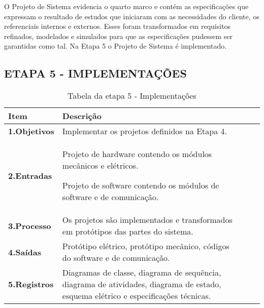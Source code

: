 O Projeto de Sistema evidencia o quarto marco e contém as especificações que expressam o resultado de estudos que iniciaram com as necessidades do cliente, os referenciais internos e externos. Esses foram transformados em requisitos refinados, modelados e simulados para que as especificações pudessem ser garantidas como tal. Na Etapa 5 o Projeto de Sistema é implementado.


\clearpage
\subsection{ETAPA 5 - IMPLEMENTAÇÕES}

\begin{table}[htbp]
	\centering
	\caption{Tabela da etapa 5 - Implementações}
	\begin{tabular}{|l| p{13.5cm}| c| c| } \hline
		\textbf{Item} 	    & \textbf{Descrição} 
		\\ \hline
		\textbf{1.Objetivos}	   &  
		Implementar os projetos definidos na Etapa 4.
		\\ \hline
		\textbf{2.Entradas}	  &		
		
		Projeto de hardware contendo os módulos mecânicos e elétricos.\par  	
		Projeto de software contendo os módulos de software e de comunicação. 
		\\ \hline	
		\textbf{3.Processo}     &
		Os projetos são implementados e transformados em protótipos das partes do sistema.
		\\ \hline
		\textbf{4.Saídas}		& 
		Protótipo elétrico, protótipo mecânico, códigos do software e de comunicação.
		\\ \hline
		\textbf{5.Registros}   & 	
		Diagramas de classe, diagrama de sequência, diagrama de atividades, diagrama de estado, esquema elétrico e especificações técnicas.
		\\ \hline
	\end{tabular}
	\label{T7}\par
\end{table}

